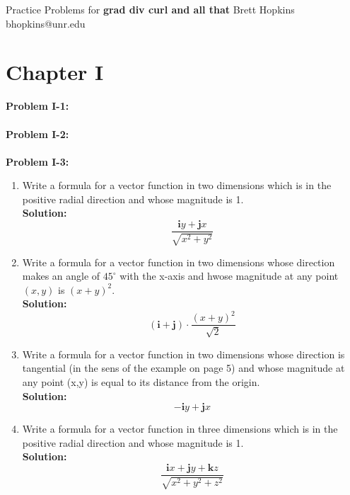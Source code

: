 \documentclass[11pt]{article}
\begin{document}
\thispagestyle{empty}
\vspace*{\fill}
\vspace{0.1cm}
\begin{center}
{\fontsize{22}{22} \selectfont Practice Problems for}
\vskip 16pt
{\fontsize{36}{36} \selectfont \bf \sffamily grad div curl and all that}
\vskip 24pt
{\fontsize{18}{18} \selectfont \rmfamily Brett Hopkins} 
\vskip 6pt
{\fontsize{14}{14} \selectfont \ttfamily bhopkins@unr.edu} 
\vskip 24pt
\end{center}

\vspace*{\fill}

\newpage
\microtoc
\newpage

\section{Chapter I}

\textbf{Problem I-1:}\\\\
\textbf{Problem I-2:}\\\\
\textbf{Problem I-3:}
\begin{enumerate}[label= \textbf{\Alph*.}]
	\item Write a formula for a vector function in two dimensions which is in the positive radial direction and whose magnitude is 1.\\
		
		\textbf{Solution:}
			\[
				\boxed{\frac{\mathbf{i} y + \mathbf{j} x}{\sqrt{x^2+y^2}}}
			\]
	\item Write a formula for a vector function in two dimensions whose direction makes an angle of
    $45^{\circ}$ with the x-axis and hwose magnitude at any point $(x,y)$ is $(x+y)^2$.\\

		\textbf{Solution:}
			\[
				\boxed{(\mathbf{i} + \mathbf{j}) \cdot \frac{(x + y)^2}{\sqrt{2}}}
			\]
	\item Write a formula for a vector function in two dimensions whose direction is tangential (in the sens of the example on page 5) and whose magnitude at any point (x,y) is equal to its distance from the origin. \\

		\textbf{Solution:}
		\[
			\boxed{-\mathbf{i}y + \mathbf{j}x}
		\]
	\item Write a formula for a vector function in three dimensions which is in the positive radial direction and whose magnitude is 1. \\
	
		\textbf{Solution:}
		\[
			\boxed{\frac{\mathbf{i}x+\mathbf{j}y+\mathbf{k}z}{\sqrt{x^2+y^2+z^2}}}
		\] 
\end{enumerate}
\end{document}
